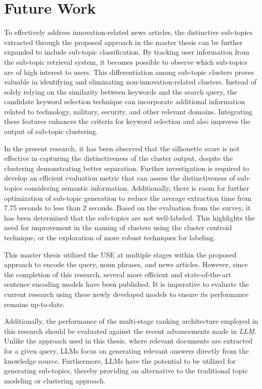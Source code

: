 \section{Future Work}

To effectively address innovation-related news articles, the distinctive sub-topics extracted through the proposed approach in the master thesis can be further expanded to include sub-topic classification. By tracking user information from the sub-topic retrieval system, it becomes possible to observe which sub-topics are of high interest to users. This differentiation among sub-topic clusters proves valuable in identifying and eliminating non-innovation-related clusters. Instead of solely relying on the similarity between keywords and the search query, the candidate keyword selection technique can incorporate additional information related to technology, military, security, and other relevant domains. Integrating these features enhances the criteria for keyword selection and also improves the output of sub-topic clustering.

In the present research, it has been observed that the silhouette score is not effective in capturing the distinctiveness of the cluster output, despite the clustering demonstrating better separation. Further investigation is required to develop an efficient evaluation metric that can assess the distinctiveness of sub-topics considering semantic information. Additionally, there is room for further optimization of sub-topic generation to reduce the average extraction time from 7.75 seconds to less than 2 seconds. Based on the evaluation from the survey, it has been determined that the sub-topics are not well-labeled. This highlights the need for improvement in the naming of clusters using the cluster centroid technique, or the exploration of more robust techniques for labeling.

This master thesis utilized the \ac{USE} at multiple stages within the proposed approach to encode the query, noun phrases, and news articles. However, since the completion of this research, several more efficient and state-of-the-art sentence encoding models have been published. It is imperative to evaluate the current research using these newly developed models to ensure its performance remains up-to-date.

Additionally, the performance of the multi-stage ranking architecture employed in this research should be evaluated against the recent advancements made in \textit{\ac{LLM}}. Unlike the approach used in this thesis, where relevant documents are extracted for a given query, \ac{LLM}s focus on generating relevant answers directly from the knowledge source. Furthermore, \ac{LLM}s have the potential to be utilized for generating sub-topics, thereby providing an alternative to the traditional topic modeling or clustering approach.


